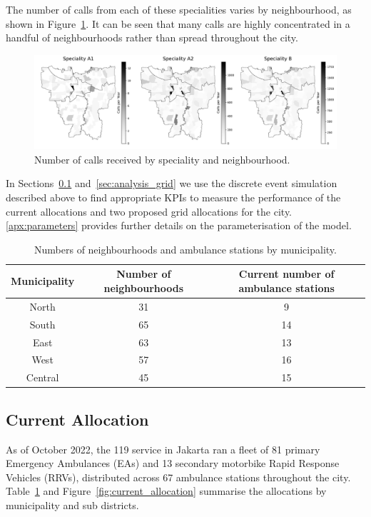 \documentclass[preprint,12pt]{elsarticle}
\begin{document}
The number of calls from each of these specialities varies by neighbourhood, as shown in Figure~\ref{fig:yearly_demand}. It can be seen that many calls are highly concentrated in a handful of neighbourhoods rather than spread throughout the city.

\begin{figure}
\begin{center}
\includegraphics[width=\textwidth]{img/yearly_demand.pdf}
\end{center}
\caption{Number of calls received by speciality and neighbourhood.}
\label{fig:yearly_demand}
\end{figure}

In Sections~\ref{sec:analysis_current} and~\ref{sec:analysis_grid} we use the discrete event simulation described above to find appropriate KPIs to measure the performance of the current allocations and two proposed grid allocations for the city. \ref{apx:parameters} provides further details on the parameterisation of the model.

\begin{table}
\begin{center}
\begin{tabular}{ccc}
\toprule
Municipality & Number of neighbourhoods & Current number of ambulance stations \\
\midrule
North   & 31 & 9 \\
South   & 65 & 14 \\
East    & 63 & 13 \\
West    & 57 & 16 \\
Central & 45 & 15 \\
\bottomrule
\end{tabular}
\caption{Numbers of neighbourhoods and ambulance stations by municipality.}
\label{tbl:jakarta}
\end{center}
\end{table}

\subsection{Current Allocation}\label{sec:analysis_current}
As of October 2022, the 119 service in Jakarta ran a fleet of 81 primary Emergency Ambulances (EAs) and 13 secondary motorbike Rapid Response Vehicles (RRVs), distributed across 67 ambulance stations throughout the city. Table~\ref{tbl:jakarta} and Figure~\ref{fig:current_allocation} summarise the allocations by municipality and sub districts. 
\end{document}
